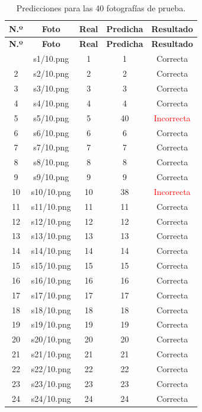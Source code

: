 \documentclass[12pt, letterpaper]{article}
\begin{document}
\begin{longtable}{c c c c c}
    \caption{Predicciones para las 40 fotografías de prueba.}
    \label{tab:predicciones}\\
    \toprule
    \textbf{N.º} & \textbf{Foto} & \textbf{Real} &
    \textbf{Predicha} & \textbf{Resultado} \\
    \midrule
    \endfirsthead
    \toprule
    \textbf{N.º} & \textbf{Foto} & \textbf{Real} &
    \textbf{Predicha} & \textbf{Resultado} \\
    \midrule
    \endhead
    \bottomrule
    \endfoot
    1  & s1/10.png  & 1  & 1  & Correcta \\
    2  & s2/10.png  & 2  & 2  & Correcta \\
    3  & s3/10.png  & 3  & 3  & Correcta \\
    4  & s4/10.png  & 4  & 4  & Correcta \\
    5  & s5/10.png  & 5  & 40 & \textcolor{red}{Incorrecta} \\
    6  & s6/10.png  & 6  & 6  & Correcta \\
    7  & s7/10.png  & 7  & 7  & Correcta \\
    8  & s8/10.png  & 8  & 8  & Correcta \\
    9  & s9/10.png  & 9  & 9  & Correcta \\
    10 & s10/10.png & 10 & 38 & \textcolor{red}{Incorrecta} \\
    11 & s11/10.png & 11 & 11 & Correcta \\
    12 & s12/10.png & 12 & 12 & Correcta \\
    13 & s13/10.png & 13 & 13 & Correcta \\
    14 & s14/10.png & 14 & 14 & Correcta \\
    15 & s15/10.png & 15 & 15 & Correcta \\
    16 & s16/10.png & 16 & 16 & Correcta \\
    17 & s17/10.png & 17 & 17 & Correcta \\
    18 & s18/10.png & 18 & 18 & Correcta \\
    19 & s19/10.png & 19 & 19 & Correcta \\
    20 & s20/10.png & 20 & 20 & Correcta \\
    21 & s21/10.png & 21 & 21 & Correcta \\
    22 & s22/10.png & 22 & 22 & Correcta \\
    23 & s23/10.png & 23 & 23 & Correcta \\
    24 & s24/10.png & 24 & 24 & Correcta \\

\end{longtable}
\end{document}
